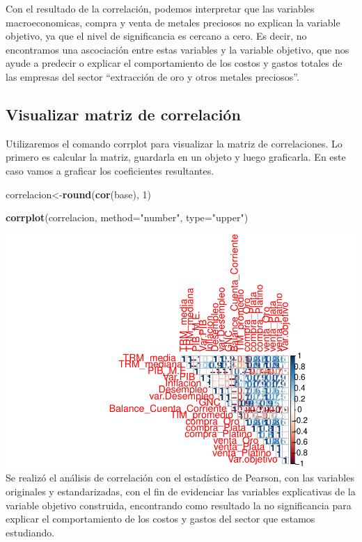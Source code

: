 \documentclass[
  11pt,
  a4paper,
]{book}
\newenvironment{Shaded}{\begin{snugshade}}{\end{snugshade}}
\newcommand{\DataTypeTok}[1]{\textcolor[rgb]{0.13,0.29,0.53}{#1}}
\newcommand{\DecValTok}[1]{\textcolor[rgb]{0.00,0.00,0.81}{#1}}
\newcommand{\KeywordTok}[1]{\textcolor[rgb]{0.13,0.29,0.53}{\textbf{#1}}}
\newcommand{\NormalTok}[1]{#1}
\newcommand{\StringTok}[1]{\textcolor[rgb]{0.31,0.60,0.02}{#1}}
\begin{document}
Con el resultado de la correlación, podemos interpretar que las
variables macroeconomicas, compra y venta de metales preciosos no
explican la variable objetivo, ya que el nivel de significancia es
cercano a cero. Es decir, no encontramos una ascociación entre estas
variables y la variable objetivo, que nos ayude a predecir o explicar el
comportamiento de los costos y gastos totales de las empresas del sector
``extracción de oro y otros metales preciosos''.

\hypertarget{visualizar-matriz-de-correlaciuxf3n}{%
\subsection{Visualizar matriz de
correlación}\label{visualizar-matriz-de-correlaciuxf3n}}

Utilizaremos el comando corrplot para visualizar la matriz de
correlaciones. Lo primero es calcular la matriz, guardarla en un objeto
y luego graficarla. En este caso vamos a graficar los coeficientes
resultantes.

\begin{Shaded}
\begin{Highlighting}[]
\NormalTok{correlacion<-}\KeywordTok{round}\NormalTok{(}\KeywordTok{cor}\NormalTok{(base), }\DecValTok{1}\NormalTok{)}

\KeywordTok{corrplot}\NormalTok{(correlacion, }\DataTypeTok{method=}\StringTok{"number"}\NormalTok{, }\DataTypeTok{type=}\StringTok{"upper"}\NormalTok{)}
\end{Highlighting}
\end{Shaded}

\includegraphics{index_files/figure-latex/unnamed-chunk-61-1.pdf} Se
realizó el análisis de correlación con el estadístico de Pearson, con
las variables originales y estandarizadas, con el fin de evidenciar las
variables explicativas de la variable objetivo construida, encontrando
como resultado la no significancia para explicar el comportamiento de
los costos y gastos del sector que estamos estudiando.
\end{document}
